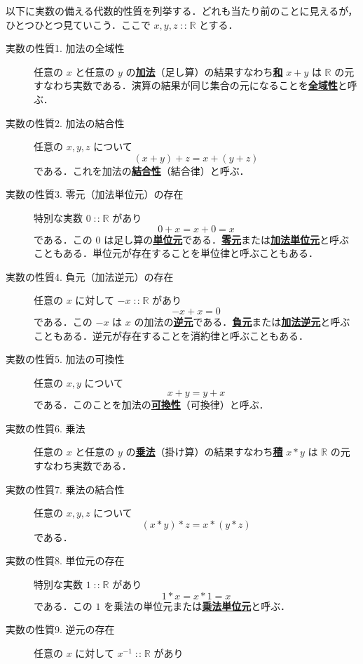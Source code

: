 \documentclass[a4paper,twocolumn]{jsbook}
\newcommand{\keyword}[1]{{\underline{\textbf{#1}}}}
\DeclareMathOperator{\mIn}{{:\!:}}
\newcommand{\mSpecialSet}[1]{\mathbb{#1}} %
\newcommand{\mRSet}{\mSpecialSet{R}}
\begin{document}
以下に実数の備える代数的性質を列挙する．どれも当たり前のことに見えるが，ひとつひとつ見ていこう．ここで $x,y,z\mIn\mRSet$ とする．
\begin{description}
\item[実数の性質1. 加法の全域性] 任意の $x$ と任意の $y$ の\keyword{加法}（足し算）の結果すなわち\keyword{和} $x+y$ は $\mRSet$ の元すなわち実数である．演算の結果が同じ集合の元になることを\keyword{全域性}と呼ぶ．
\item[実数の性質2. 加法の結合性] 任意の $x,y,z$ について
\begin{equation}
(x+y)+z=x+(y+z)
\end{equation}
である．これを加法の\keyword{結合性}（結合律）と呼ぶ．
\item[実数の性質3. 零元（加法単位元）の存在] 特別な実数 $0\mIn\mRSet$ があり
\begin{equation}
0+x=x+0=x
\end{equation}
である．この $0$ は足し算の\keyword{単位元}である．\keyword{零元}または\keyword{加法単位元}と呼ぶこともある．単位元が存在することを単位律と呼ぶこともある．
\item[実数の性質4. 負元（加法逆元）の存在] 任意の $x$ に対して $-x\mIn\mRSet$ があり
\begin{equation}
-x+x=0
\end{equation}
である．この $-x$ は $x$ の加法の\keyword{逆元}である．\keyword{負元}または\keyword{加法逆元}と呼ぶこともある．逆元が存在することを消約律と呼ぶこともある．
\item[実数の性質5. 加法の可換性] 任意の $x,y$ について
\begin{equation}
x+y=y+x
\end{equation}
である．このことを加法の\keyword{可換性}（可換律）と呼ぶ．
\item[実数の性質6. 乗法] 任意の $x$ と任意の $y$ の\keyword{乗法}（掛け算）の結果すなわち\keyword{積} $x*y$ は $\mRSet$ の元すなわち実数である．
\item[実数の性質7. 乗法の結合性] 任意の $x,y,z$ について
\begin{equation}
(x*y)*z=x*(y*z)
\end{equation}
である．
\item[実数の性質8. 単位元の存在] 特別な実数 $1\mIn\mRSet$ があり
\begin{equation}
1*x=x*1=x
\end{equation}
である．この $1$ を乗法の単位元または\keyword{乗法単位元}と呼ぶ．
\item[実数の性質9. 逆元の存在] 任意の $x$ に対して $x^{-1}\mIn\mRSet$ があり

\end{description}
\end{document}
